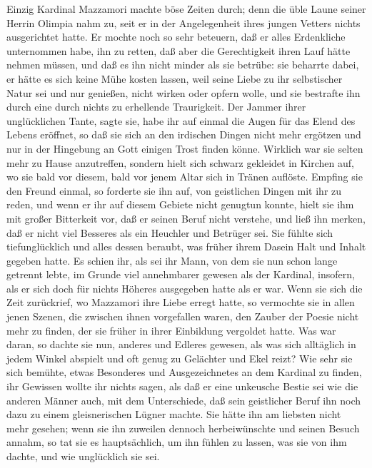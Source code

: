 \pagenum{[80]} Einzig Kardinal Mazzamori machte böse Zeiten durch;
denn die üble Laune seiner Herrin Olimpia nahm zu, seit er in der
Angelegenheit ihres jungen Vetters nichts ausgerichtet hatte. Er
mochte noch so sehr beteuern, daß er alles Erdenkliche unternommen
habe, ihn zu retten, daß aber die Gerechtigkeit ihren Lauf hätte
nehmen müssen, und daß es ihn nicht minder als sie betrübe: sie
beharrte dabei, er hätte es sich keine Mühe kosten lassen, weil
seine Liebe zu ihr selbstischer Natur sei und nur genießen, nicht
wirken oder opfern wolle, und sie bestrafte ihn durch eine durch
nichts zu erhellende Traurigkeit. Der Jammer ihrer unglücklichen
Tante, sagte sie, habe ihr auf einmal die Augen für das Elend des
Lebens eröffnet, so daß sie sich an den irdischen Dingen nicht mehr
ergötzen und nur in der Hingebung an Gott einigen Trost finden
könne. Wirklich war sie selten mehr zu Hause anzutreffen, sondern
hielt sich schwarz gekleidet in Kirchen auf, wo sie bald vor
diesem, bald vor jenem Altar sich in Tränen auflöste. Empfing sie
den Freund einmal, so forderte sie ihn auf, von geistlichen Dingen
mit ihr zu reden, und wenn er ihr auf diesem Gebiete nicht genugtun
konnte, hielt sie ihm mit großer Bitterkeit vor, daß er seinen
Beruf nicht verstehe, und ließ ihn merken, daß er nicht viel
Besseres als ein Heuchler und Betrüger sei. Sie fühlte sich
tiefunglücklich und alles dessen beraubt, was früher ihrem Dasein
Halt und Inhalt gegeben hatte. Es schien ihr, als sei ihr Mann, von
dem sie nun schon lange getrennt lebte, im Grunde viel annehmbarer
gewesen als der Kardinal, insofern, als er sich doch für nichts
Höheres ausgegeben hatte als er war. Wenn sie sich die Zeit
zurückrief, wo Mazzamori ihre Liebe erregt hatte, so vermochte sie
in allen jenen Szenen, die zwischen \pagenum{[81]} ihnen
vorgefallen waren, den Zauber der Poesie nicht mehr zu finden, der
sie früher in ihrer Einbildung vergoldet hatte. Was war daran, so
dachte sie nun, anderes und Edleres gewesen, als was sich
alltäglich in jedem Winkel abspielt und oft genug zu Gelächter und
Ekel reizt? Wie sehr sie sich bemühte, etwas Besonderes und
Ausgezeichnetes an dem Kardinal zu finden, ihr Gewissen wollte ihr
nichts sagen, als daß er eine unkeusche Bestie sei wie die anderen
Männer auch, mit dem Unterschiede, daß sein geistlicher Beruf ihn
noch dazu zu einem gleisnerischen Lügner machte. Sie hätte ihn am
liebsten nicht mehr gesehen; wenn sie ihn zuweilen dennoch
herbeiwünschte und seinen Besuch annahm, so tat sie es
hauptsächlich, um ihn fühlen zu lassen, was sie von ihm dachte, und
wie unglücklich sie sei.

